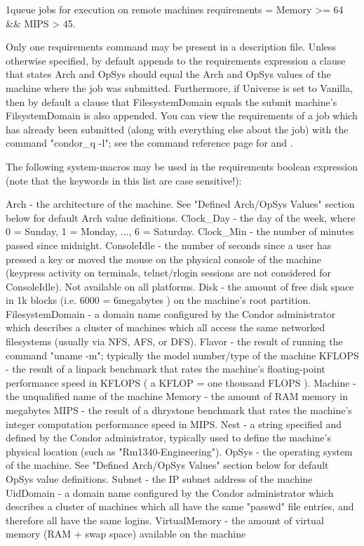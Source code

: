 \begin{ManPage}{}{1}{queue jobs for execution on remote machines}
requirements = Memory >= 64 \&\& MIPS > 45. 

Only one requirements command may be present in a description file. Unless otherwise specified,  by default
appends to the requirements expression a clause that states Arch and OpSys should equal the Arch and OpSys values of
the machine where the job was submitted. Furthermore, if Universe is set to Vanilla, then by default a clause that
FilesystemDomain equals the submit machine's FilsystemDomain is also appended. You can view the requirements of a job
which has already been submitted (along with everything else about the job) with the command "condor\_q -l"; see the
command reference page for  and . 

The following system-macros may be used in the requirements boolean expression (note that the keywords in this list are
case sensitive!): 

     Arch - the architecture of the machine. See "Defined Arch/OpSys Values" section below for default Arch value
     definitions. 
     Clock\_Day - the day of the week, where 0 = Sunday, 1 = Monday, ..., 6 = Saturday. 
     Clock\_Min - the number of minutes passed since midnight. 
     ConsoleIdle - the number of seconds since a user has pressed a key or moved the mouse on the physical console
     of the machine (keypress activity on terminals, telnet/rlogin sessions are not considered for ConsoleIdle). Not
     available on all platforms. 
     Disk - the amount of free disk space in 1k blocks (i.e. 6000 = 6megabytes ) on the machine's root partition. 
     FilesystemDomain - a domain name configured by the Condor administrator which describes a cluster of machines
     which all access the same networked filesystems (usually via NFS, AFS, or DFS). 
     Flavor - the result of running the command "uname -m"; typically the model number/type of the machine 
     KFLOPS - the result of a linpack benchmark that rates the machine's floating-point performance speed in KFLOPS (
     a KFLOP = one thousand FLOPS ). 
     Machine - the unqualified name of the machine 
     Memory - the amount of RAM memory in megabytes 
     MIPS - the result of a dhrystone benchmark that rates the machine's integer computation performance speed in
     MIPS. 
     Nest - a string specified and defined by the Condor administrator, typically used to define the machine's physical
     location (such as "Rm1340-Engineering"). 
     OpSys - the operating system of the machine. See "Defined Arch/OpSys Values" section below for default OpSys
     value definitions. 
     Subnet - the IP subnet address of the machine 
     UidDomain - a domain name configured by the Condor administrator which describes a cluster of machines which
     all have the same "passwd" file entries, and therefore all have the same logins. 
     VirtualMemory - the amount of virtual memory (RAM + swap space) available on the machine 


\end{ManPage}
